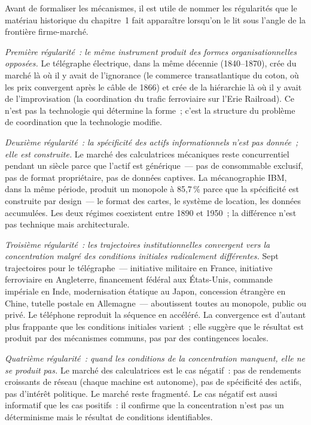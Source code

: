 Avant de formaliser les mécanismes, il est utile de nommer les régularités que le matériau historique du chapitre~1 fait apparaître lorsqu'on le lit sous l'angle de la frontière firme-marché.

\emph{Première régularité~: le même instrument produit des formes organisationnelles opposées.} Le télégraphe électrique, dans la même décennie (1840--1870), crée du marché là où il y avait de l'ignorance (le commerce transatlantique du coton, où les prix convergent après le câble de 1866) et crée de la hiérarchie là où il y avait de l'improvisation (la coordination du trafic ferroviaire sur l'Erie Railroad). Ce n'est pas la technologie qui détermine la forme~; c'est la structure du problème de coordination que la technologie modifie.

\emph{Deuxième régularité~: la spécificité des actifs informationnels n'est pas donnée~; elle est construite.} Le marché des calculatrices mécaniques reste concurrentiel pendant un siècle parce que l'actif est générique~--- pas de consommable exclusif, pas de format propriétaire, pas de données captives. La mécanographie IBM, dans la même période, produit un monopole à 85,7\,\% parce que la spécificité est construite par design~--- le format des cartes, le système de location, les données accumulées. Les deux régimes coexistent entre 1890 et 1950~; la différence n'est pas technique mais architecturale.

\emph{Troisième régularité~: les trajectoires institutionnelles convergent vers la concentration malgré des conditions initiales radicalement différentes.} Sept trajectoires pour le télégraphe~--- initiative militaire en France, initiative ferroviaire en Angleterre, financement fédéral aux États-Unis, commande impériale en Inde, modernisation étatique au Japon, concession étrangère en Chine, tutelle postale en Allemagne~--- aboutissent toutes au monopole, public ou privé. Le téléphone reproduit la séquence en accéléré. La convergence est d'autant plus frappante que les conditions initiales varient~; elle suggère que le résultat est produit par des mécanismes communs, pas par des contingences locales.

\emph{Quatrième régularité~: quand les conditions de la concentration manquent, elle ne se produit pas.} Le marché des calculatrices est le cas négatif~: pas de rendements croissants de réseau (chaque machine est autonome), pas de spécificité des actifs, pas d'intérêt politique. Le marché reste fragmenté. Le cas négatif est aussi informatif que les cas positifs~: il confirme que la concentration n'est pas un déterminisme mais le résultat de conditions identifiables.

